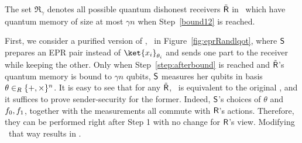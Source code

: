\begin{definition}\label{boundedstorage12}
  The set $\mathfrak{R}_{\gamma}$ denotes all possible quantum
  dishonest receivers $\dR$ in \Randlqot\ which
  have quantum memory of size at most $\gamma n$ when Step~\ref{bound12}
  is reached.
\end{definition}
%

First, we consider a purified version of \Randlqot, \eprRandlqot\ in
Figure~\ref{fig:eprRandlqot}, where $\S$ prepares an EPR pair
 instead
of $\ket{x_i}_{\theta_i}$ and sends one part to the receiver while
keeping the other. Only when Step~\ref{step:afterbound} is reached and $\dR$'s
quantum memory is bound to $\gamma n$ qubits, $\S$ measures her qubits
in basis $\theta \in_R \set{+,\times}^n$. It is easy to see that for
any $\dR$, \eprRandlqot\ is equivalent to the original \Randlqot, and
it suffices to prove sender-security for the former.  Indeed, $\S$'s
choices of $\theta$ and $\hf_0,\hf_1$, together with the measurements
all commute with $\R$'s actions.  Therefore, they can be performed
right after Step 1 with no change for $\R$'s view. Modifying
\eprRandlqot\ that way results in \Randlqot.

